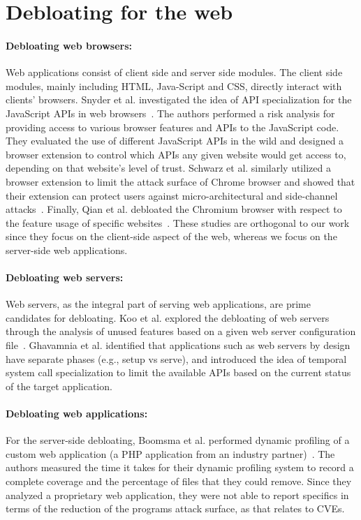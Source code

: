 \section{Debloating for the web}

\paragraph{Debloating web browsers:} Web applications consist of client side and server side modules. 
The client side modules, mainly including HTML, Java-Script and CSS, directly interact with clients' browsers. 
Snyder et al. investigated the idea of API specialization for the JavaScript APIs in web browsers~\cite{snyder2017vibrate}. 
The authors performed a risk analysis for providing access to various browser features and APIs to the JavaScript code.
They evaluated the use of different
JavaScript APIs in the wild and designed a browser extension
to control which APIs any given website would get access to, depending
on that website's level of trust. 
Schwarz et al. similarly utilized a browser
extension to limit the attack surface of Chrome browser and showed that their extension can protect users against micro-architectural and side-channel attacks~\cite{Schwarz2018}. 
Finally, Qian et al. debloated the Chromium browser with respect to the feature usage of specific websites~\cite{qian2020slimium}. 
These studies are orthogonal to our work since
they focus on the client-side aspect of the web, whereas we focus on the server-side web applications. 

\paragraph{Debloating web servers:} Web servers, as the integral part of serving web applications, are prime candidates for debloating. 
Koo et al. explored the debloating of web servers through the analysis of unused features based on a given web server configuration file~\cite{koo2019configuration}. 
Ghavamnia et al. identified that applications such as web servers by design have separate phases (e.g., setup vs serve), and introduced the idea of temporal system call specialization to limit the available APIs based on the current status of the target application. 

\paragraph{Debloating web applications:} For the server-side debloating, Boomsma et al. performed dynamic profiling of a custom web application (a PHP application from an industry partner)~\cite{boomsma2012Dead}. 
The authors measured the time it takes for their dynamic profiling system to record a
complete coverage and the percentage of files that they could remove. Since they analyzed a proprietary web application, they were not able to report specifics
in terms of the reduction of the programs attack surface, as that relates
to CVEs. 

